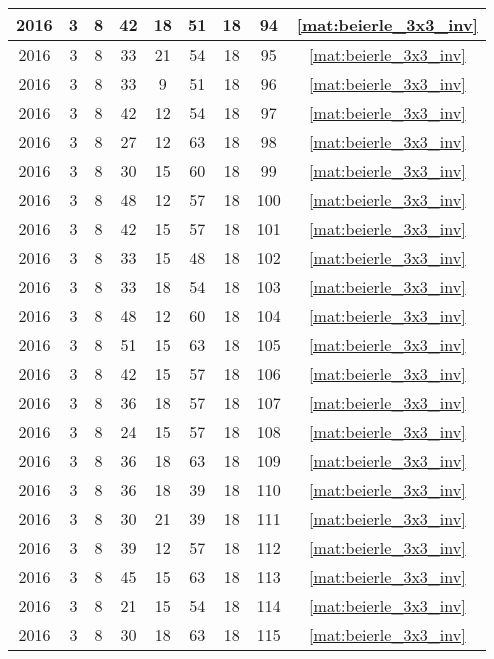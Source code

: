\begin{longtable}{|c|c|c|c|c|c|c|c|c|}
2016 & 3 & 8 & 42 & 18 & 51 & 18 & 94 & \eqref{mat:beierle_3x3_inv} \\ \hline 
2016 & 3 & 8 & 33 & 21 & 54 & 18 & 95 & \eqref{mat:beierle_3x3_inv} \\ \hline 
2016 & 3 & 8 & 33 & 9 & 51 & 18 & 96 & \eqref{mat:beierle_3x3_inv} \\ \hline 
2016 & 3 & 8 & 42 & 12 & 54 & 18 & 97 & \eqref{mat:beierle_3x3_inv} \\ \hline 
2016 & 3 & 8 & 27 & 12 & 63 & 18 & 98 & \eqref{mat:beierle_3x3_inv} \\ \hline 
2016 & 3 & 8 & 30 & 15 & 60 & 18 & 99 & \eqref{mat:beierle_3x3_inv} \\ \hline 
2016 & 3 & 8 & 48 & 12 & 57 & 18 & 100 & \eqref{mat:beierle_3x3_inv} \\ \hline 
2016 & 3 & 8 & 42 & 15 & 57 & 18 & 101 & \eqref{mat:beierle_3x3_inv} \\ \hline 
2016 & 3 & 8 & 33 & 15 & 48 & 18 & 102 & \eqref{mat:beierle_3x3_inv} \\ \hline 
2016 & 3 & 8 & 33 & 18 & 54 & 18 & 103 & \eqref{mat:beierle_3x3_inv} \\ \hline 
2016 & 3 & 8 & 48 & 12 & 60 & 18 & 104 & \eqref{mat:beierle_3x3_inv} \\ \hline 
2016 & 3 & 8 & 51 & 15 & 63 & 18 & 105 & \eqref{mat:beierle_3x3_inv} \\ \hline 
2016 & 3 & 8 & 42 & 15 & 57 & 18 & 106 & \eqref{mat:beierle_3x3_inv} \\ \hline 
2016 & 3 & 8 & 36 & 18 & 57 & 18 & 107 & \eqref{mat:beierle_3x3_inv} \\ \hline 
2016 & 3 & 8 & 24 & 15 & 57 & 18 & 108 & \eqref{mat:beierle_3x3_inv} \\ \hline 
2016 & 3 & 8 & 36 & 18 & 63 & 18 & 109 & \eqref{mat:beierle_3x3_inv} \\ \hline 
2016 & 3 & 8 & 36 & 18 & 39 & 18 & 110 & \eqref{mat:beierle_3x3_inv} \\ \hline 
2016 & 3 & 8 & 30 & 21 & 39 & 18 & 111 & \eqref{mat:beierle_3x3_inv} \\ \hline 
2016 & 3 & 8 & 39 & 12 & 57 & 18 & 112 & \eqref{mat:beierle_3x3_inv} \\ \hline 
2016 & 3 & 8 & 45 & 15 & 63 & 18 & 113 & \eqref{mat:beierle_3x3_inv} \\ \hline 
2016 & 3 & 8 & 21 & 15 & 54 & 18 & 114 & \eqref{mat:beierle_3x3_inv} \\ \hline 
2016 & 3 & 8 & 30 & 18 & 63 & 18 & 115 & \eqref{mat:beierle_3x3_inv} \\ \hline 

\end{longtable}
